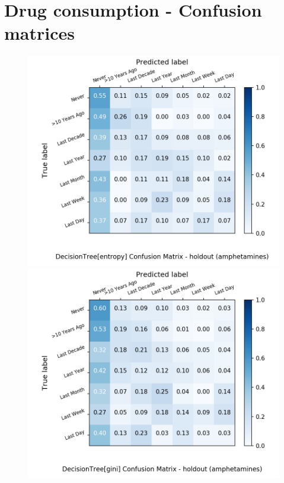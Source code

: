 \section{Drug consumption - Confusion matrices}\label{app:drug_conf_matr}

\begin{figure}[H]
	\centering
	\begin{minipage}[b]{0.32\textwidth}
		\includegraphics[width=1.1\textwidth]{Plots/amphetamines_DecisionTree_entropy_balance_False_holdout.png}
	\end{minipage}
	\begin{minipage}[b]{0.32\textwidth}
		\includegraphics[width=1.1\textwidth]{Plots/amphetamines_DecisionTree_gini_balance_False_holdout.png}

\end{minipage}
\end{figure}
